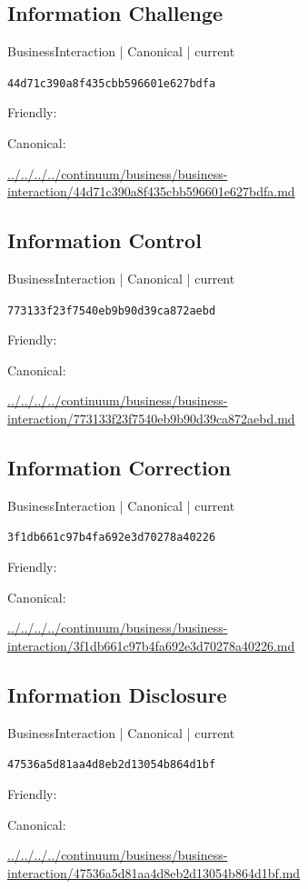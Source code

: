 \documentclass[10pt,a4paper]{article}
\begin{document}
\subsection*{Information Challenge}
{\small BusinessInteraction | Canonical | current}\par
\texttt{44d71c390a8f435cbb596601e627bdfa}\par
Friendly: \par
Canonical: \par
{\footnotesize\url{../../../../continuum/business/business-interaction/44d71c390a8f435cbb596601e627bdfa.md}}\par
\subsection*{Information Control}
{\small BusinessInteraction | Canonical | current}\par
\texttt{773133f23f7540eb9b90d39ca872aebd}\par
Friendly: \par
Canonical: \par
{\footnotesize\url{../../../../continuum/business/business-interaction/773133f23f7540eb9b90d39ca872aebd.md}}\par
\subsection*{Information Correction}
{\small BusinessInteraction | Canonical | current}\par
\texttt{3f1db661c97b4fa692e3d70278a40226}\par
Friendly: \par
Canonical: \par
{\footnotesize\url{../../../../continuum/business/business-interaction/3f1db661c97b4fa692e3d70278a40226.md}}\par
\subsection*{Information Disclosure}
{\small BusinessInteraction | Canonical | current}\par
\texttt{47536a5d81aa4d8eb2d13054b864d1bf}\par
Friendly: \par
Canonical: \par
{\footnotesize\url{../../../../continuum/business/business-interaction/47536a5d81aa4d8eb2d13054b864d1bf.md}}\par
\end{document}
